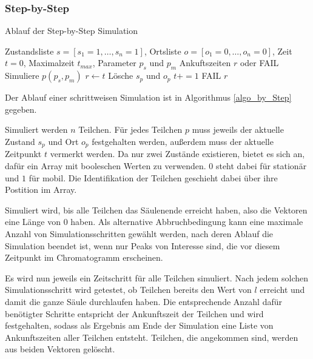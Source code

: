 \subsubsection{Step-by-Step}
\begin{algorithm}
\caption{Ablauf der Step-by-Step Simulation}
\label{algo_by_Step}
\begin{algorithmic}
\REQUIRE Zustandsliste $s= [s_1 = 1, \ldots, s_n=1]$, Ortsliste $o=[o_1=0, \ldots , o_n=0]$, Zeit $t=0$, Maximalzeit $t_{max}$, Parameter $p_s$ und $p_m$
\ENSURE Ankuftszeiten $r$ oder FAIL
\STATE Simuliere $p(p_s, p_m)$
\STATE $r \leftarrow t$
\STATE Lösche $s_p$ und $o_p$
\ENDIF
\ENDFOR
\STATE $t +=1$
\ENDWHILE
{}
\RETURN FAIL
\ELSE
\RETURN $r$
\ENDIF
\end{algorithmic}
\end{algorithm}



Der Ablauf einer schrittweisen Simulation ist in Algorithmus \ref{algo_by_Step} gegeben.

Simuliert werden $n$ Teilchen. Für jedes Teilchen $p$ muss jeweils der aktuelle Zustand $s_p$ und Ort $o_p$ festgehalten werden, außerdem muss der aktuelle Zeitpunkt $t$ vermerkt werden. Da nur zwei Zustände existieren, bietet es sich an, dafür ein Array mit booleschen Werten zu verwenden. $0$ steht dabei für stationär und $1$ für mobil. Die Identifikation der Teilchen geschieht dabei über ihre Postition im Array.

Simuliert wird, bis alle Teilchen das Säulenende erreicht haben, also die Vektoren eine Länge von $0$ haben. 
Als alternative Abbruchbedingung kann eine maximale Anzahl von Simulationsschritten gewählt werden, nach deren Ablauf die Simulation beendet ist, wenn nur Peaks von Interesse sind, die vor diesem Zeitpunkt im Chromatogramm erscheinen.

Es wird nun jeweils ein Zeitschritt für alle Teilchen simuliert. Nach jedem solchen Simulationsschritt wird getestet, ob Teilchen bereits den Wert von $l$ erreicht und damit die ganze Säule durchlaufen haben. Die entsprechende Anzahl dafür benötigter Schritte entspricht der Ankunftszeit der Teilchen und wird festgehalten, sodass als Ergebnis am Ende der Simulation eine Liste von Ankunftszeiten aller Teilchen entsteht. Teilchen, die angekommen sind, werden aus beiden Vektoren gelöscht.

